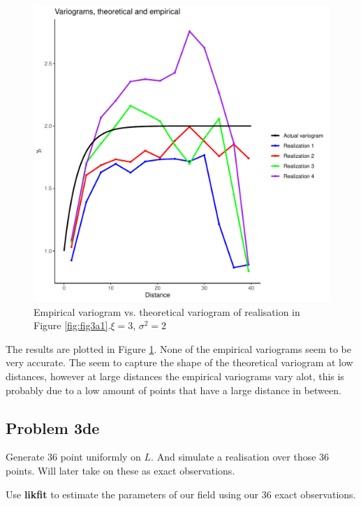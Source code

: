 \documentclass[]{article}
\begin{document}
\begin{figure}

{\centering \includegraphics{Exercise-1_files/figure-latex/fig3b1-1} 

}

\caption{\label{fig:fig3b1} Empirical variogram vs. theoretical variogram of realisation in Figure \ref{fig:fig3a1}.$\xi = 3$, $\sigma^2 = 2$}\label{fig:fig3b1}
\end{figure}

The results are plotted in Figure \ref{fig:fig3b1}. None of the
empirical variograms seem to be very accurate. The seem to capture the
shape of the theoretical variogram at low distances, however at large
distances the empirical variograms vary alot, this is probably due to a
low amount of points that have a large distance in between.

\newpage

\hypertarget{problem-3de}{%
\subsection{Problem 3de}\label{problem-3de}}

Generate 36 point uniformly on \(L\). And simulate a realisation over
those 36 points. Will later take on these as exact observations.

Use \textbf{likfit} to estimate the parameters of our field using our 36
exact observations.
\end{document}
